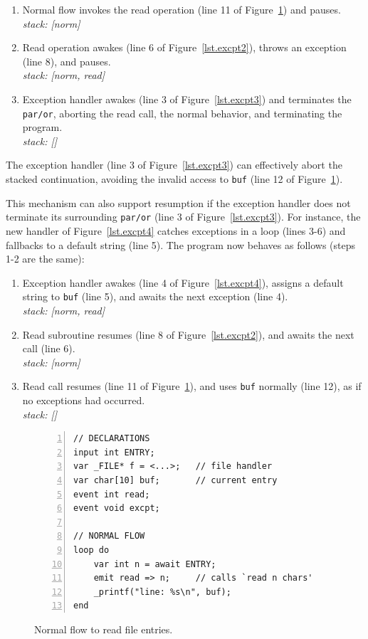 \documentclass{acm_proc_article-sp}
\newcommand{\code}[1] {{\small{\texttt{#1}}}}
\newcommand{\1}{\;}
\newcommand{\2}{\;\;}
\newcommand{\3}{\;\;\;}
\newcommand{\5}{\;\;\;\;\;}
\begin{document}
{\small
\begin{enumerate}
\setlength{\itemsep}{0pt}
\item Normal flow invokes the read operation (line 11 of 
    Figure~\ref{lst.excpt1}) and pauses.\\
    \emph{stack: [norm]}
\item Read operation awakes (line 6 of Figure~\ref{lst.excpt2}), throws an 
    exception (line 8), and pauses.\\
    \emph{stack: [norm, read]}
\item Exception handler awakes (line 3 of Figure~\ref{lst.excpt3}) and 
terminates the \code{par/or}, aborting the read call, the normal behavior, and 
terminating the program. \\
    \emph{stack: []}
\end{enumerate}
}

The exception handler (line 3 of Figure~\ref{lst.excpt3}) can effectively abort 
the stacked continuation, avoiding the invalid access to \code{buf} (line 12 of 
Figure~\ref{lst.excpt1}).
%

This mechanism can also support resumption if the exception handler does not 
terminate its surrounding \code{par/or} (line 3 of Figure~\ref{lst.excpt3}).
For instance, the new handler of Figure~\ref{lst.excpt4} catches exceptions in 
a loop (lines 3-6) and fallbacks to a default string (line 5).
The program now behaves as follows (steps 1-2 are the same):

{\small
\begin{enumerate}[start=3]
\setlength{\itemsep}{0pt}
\item Exception handler awakes (line 4 of Figure~\ref{lst.excpt4}), assigns a 
default string to \code{buf} (line 5), and awaits the next exception (line 4).  \\
    \emph{stack: [norm, read]}
\item Read subroutine resumes (line 8 of Figure~\ref{lst.excpt2}), and awaits 
the next call (line 6). \\
    \emph{stack: [norm]}
\item Read call resumes (line 11 of Figure~\ref{lst.excpt1}), and uses 
\code{buf} normally (line 12), as if no exceptions had occurred. \\
    \emph{stack: []}
\end{enumerate}
}

\begin{figure}[t]
\begin{lstlisting}[numbers=left,xleftmargin=2em]
// DECLARATIONS
input int ENTRY;
var _FILE* f = <...>;   // file handler
var char[10] buf;       // current entry
event int read;
event void excpt;

// NORMAL FLOW
loop do
    var int n = await ENTRY;
    emit read => n;     // calls `read n chars'
    _printf("line: %s\n", buf);
end
\end{lstlisting}
\caption{ Normal flow to read file entries.
\label{lst.excpt1}
}
\end{figure}
\end{document}
